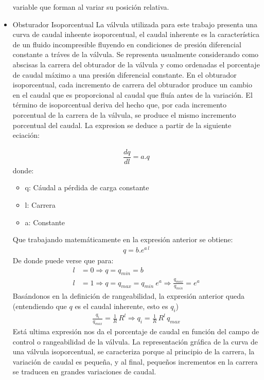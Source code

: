 \begin{itemize}
  variable que forman al variar su posición relativa.
  \item Obsturador Isoporcentual
  La válvula utilizada para este trabajo presenta una curva de caudal inheente 
  isoporcentual, el caudal inherente es la característica de un fluido incompresible
  fluyendo en condiciones de presión diferencial constante a tráves de la válvula. 
  Se representa usualmente considerando como abscisas la carrera del obturador de la
  válvula y como ordenadas el porcentaje de caudal máximo a una presión diferencial 
  constante.
  En el obturador isoporcentual, cada incremento de carrera del obturador produce
  un cambio en el caudal que es proporcional al caudal que fluía antes de la 
  variación. 
  El término de isoporcentual deriva del hecho que, por cada
  incremento porcentual de la carrera de la válvula, se produce el mismo
  incremento porcentual del caudal. 
  La expresion se deduce a partir de la siguiente eciación:
  
  \begin{align}
    \dfrac{dq}{dl} = a . q
  \end{align}
  donde:
  \begin{itemize}
      \item q: Cáudal a pérdida de carga constante
      \item l: Carrera
      \item a: Constante
    \end{itemize}
    Que trabajando matemáticamente en la expresión anterior se obtiene:
    \begin{align}
       q = b . e^{a\,l}
    \end{align}
    De donde puede verse que para:
    \begin{align}
        l &= 0 \Rightarrow q = q_{min} = b\\
        l &= 1 \Rightarrow q = q_{max} = q_{min} \:e^a
        \Rightarrow \frac{q_{max}}{q_{min}} = e^a
    \end{align}
    Basándonos en la definición de rangeabilidad, la expresión anterior
    queda (entendiendo que ${q}$ es el caudal inherente, esto es ${q_i}$)
    \begin{align}
        \frac{q_i}{q_{max}} = \frac{1}{R} \,R^l
        \Rightarrow  q_i = \frac{1}{R} \, R^l \, q_{max}
    \end{align}
    Está ultima expresión nos da el porcentaje de caudal en función del
    campo de control o rangeabilidad de la válvula.
    La representación gráfica de la curva de una válvula isoporcentual, se
    caracteriza porque al principio de la carrera, la variación de caudal es
    pequeña, y al final, pequeños incrementos en la carrera se traducen en
    grandes variaciones de caudal.
    

\end{itemize}

